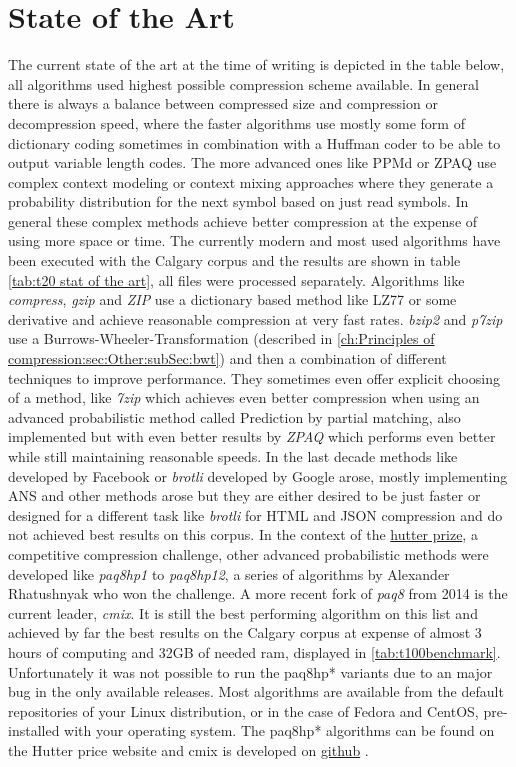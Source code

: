 \section{State of the Art}
\label{ch:Principles of compression:sec:SOTA}
\par{
The current state of the art at the time of writing is depicted in the table below, all algorithms used highest possible compression scheme available. In general there is always a balance between compressed size and compression or decompression speed, where the faster algorithms use mostly some form of dictionary coding sometimes in combination with a Huffman coder to be able to output variable length codes. The more advanced ones like PPMd or ZPAQ use complex context modeling or context mixing approaches where they generate a probability distribution for the next symbol based on just read symbols. In general these complex methods achieve better compression at the expense of using more space or time. The currently modern and most used algorithms have been executed with the Calgary corpus and the results are shown in table \ref{tab:t20 stat of the art}, all files were processed separately. Algorithms like \textit{compress}, \textit{gzip} and \textit{ZIP} use a dictionary based method like LZ77 or some derivative and achieve reasonable compression at very fast rates. \textit{bzip2} and \textit{p7zip} use a Burrows-Wheeler-Transformation (described in \ref{ch:Principles of compression:sec:Other:subSec:bwt}) and then a combination of different techniques to improve performance. They sometimes even offer explicit choosing of a method, like \textit{7zip} which achieves even better compression when using an advanced probabilistic method called Prediction by partial matching, also implemented but with even better results by \textit{ZPAQ} which performs even better while still maintaining reasonable speeds. In the last decade methods like  developed by Facebook or \textit{brotli} developed by Google arose, mostly implementing ANS and other methods arose but they are either desired to be just faster or designed for a different task like \textit{brotli} for HTML and JSON compression and do not achieved best results on this corpus. In the context of the \href{http://prize.hutter1.net/}{hutter prize}, a competitive compression challenge, other advanced probabilistic methods were developed like \textit{paq8hp1} to \textit{paq8hp12}, a series of algorithms by Alexander Rhatushnyak \cite{mahoney2011large} who won the challenge. A more recent fork of \textit{paq8} from 2014 is the current leader, \textit{cmix}. It is still the best performing algorithm on this list and achieved by far the best results on the Calgary corpus at expense of almost 3 hours of computing and 32GB of needed ram, displayed in \ref{tab:t100benchmark}. Unfortunately it was not possible to run the paq8hp* variants due to an major bug in the only available releases. Most algorithms are available from the default repositories of your Linux distribution, or in the case of Fedora and CentOS, pre-installed with your operating system. The paq8hp* algorithms can be found on the Hutter price website and cmix is developed on \href{https://github.com/byronknoll/cmix}{github} \cite{cmix}.
}
